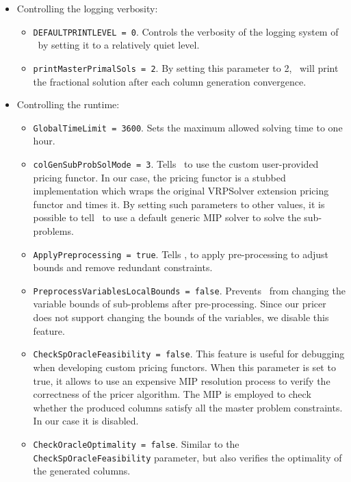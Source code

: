 \begin{itemize}
	\item Controlling the logging verbosity:
	      \begin{itemize}
		      \item \texttt{DEFAULTPRINTLEVEL = 0}.
		            Controls the verbosity of the logging system of \bapcod\ by setting it to a relatively quiet level.
		      \item \texttt{printMasterPrimalSols = 2}.
		            By setting this parameter to 2, \bapcod\ will print the fractional solution after each column generation convergence.
	      \end{itemize}

	\item Controlling the runtime:
	      \begin{itemize}
		      \item \texttt{GlobalTimeLimit = 3600}. Sets the maximum allowed solving time to one hour.
		      \item \texttt{colGenSubProbSolMode = 3}. Tells \bapcod\ to use the custom user-provided pricing functor.
		            In our case, the pricing functor is a stubbed implementation which wraps the original VRPSolver extension pricing functor
		            and times it.
		            By setting such parameters to other values, it is possible to tell \bapcod\ to use a default generic MIP solver to solve the sub-problems.
		      \item \texttt{ApplyPreprocessing = true}. Tells \bapcod, to apply pre-processing to adjust bounds and remove redundant constraints.
		      \item \texttt{PreprocessVariablesLocalBounds = false}.
		            Prevents \bapcod\ from changing the variable bounds of sub-problems after pre-processing.
		            Since our pricer does not support changing the bounds of the variables,
		            we disable this feature.
		      \item \texttt{CheckSpOracleFeasibility = false}.
		            This feature is useful for debugging when developing custom pricing functors.
		            When this parameter is set to true, it allows to use an expensive MIP resolution process
		            to verify the correctness of the pricer algorithm.
		            The MIP is employed to check whether the produced columns satisfy all the master problem constraints.
		            In our case it is disabled.
		      \item \texttt{CheckOracleOptimality = false}.
		            Similar to the \texttt{CheckSpOracleFeasibility} parameter, but also verifies the optimality of the generated columns.
	      \end{itemize}


\end{itemize}
